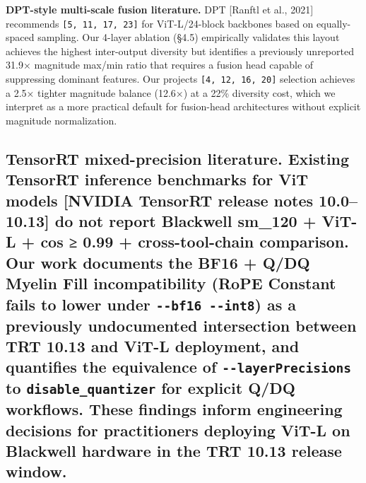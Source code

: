 \documentclass[
]{article}
\begin{document}
\textbf{DPT-style multi-scale fusion literature.} DPT {[}Ranftl et al.,
2021{]} recommends \texttt{{[}5,\ 11,\ 17,\ 23{]}} for ViT-L/24-block
backbones based on equally-spaced sampling. Our 4-layer ablation (§4.5)
empirically validates this layout achieves the highest inter-output
diversity but identifies a previously unreported 31.9× magnitude max/min
ratio that requires a fusion head capable of suppressing dominant
features. Our project\textquotesingle s \texttt{{[}4,\ 12,\ 16,\ 20{]}}
selection achieves a 2.5× tighter magnitude balance (12.6×) at a 22\%
diversity cost, which we interpret as a more practical default for
fusion-head architectures without explicit magnitude normalization.

\subsection{\texorpdfstring{\textbf{TensorRT mixed-precision
literature.} Existing TensorRT inference benchmarks for ViT models
{[}NVIDIA TensorRT release notes 10.0--10.13{]} do not report Blackwell
sm\_120 + ViT-L + cos ≥ 0.99 + cross-tool-chain comparison. Our work
documents the BF16 + Q/DQ Myelin Fill incompatibility (RoPE Constant
fails to lower under \texttt{-\/-bf16\ -\/-int8}) as a previously
undocumented intersection between TRT 10.13 and ViT-L deployment, and
quantifies the equivalence of \texttt{-\/-layerPrecisions} to
\texttt{disable\_quantizer} for explicit Q/DQ workflows. These findings
inform engineering decisions for practitioners deploying ViT-L on
Blackwell hardware in the TRT 10.13 release
window.}{TensorRT mixed-precision literature. Existing TensorRT inference benchmarks for ViT models {[}NVIDIA TensorRT release notes 10.0--10.13{]} do not report Blackwell sm\_120 + ViT-L + cos ≥ 0.99 + cross-tool-chain comparison. Our work documents the BF16 + Q/DQ Myelin Fill incompatibility (RoPE Constant fails to lower under -\/-bf16 -\/-int8) as a previously undocumented intersection between TRT 10.13 and ViT-L deployment, and quantifies the equivalence of -\/-layerPrecisions to disable\_quantizer for explicit Q/DQ workflows. These findings inform engineering decisions for practitioners deploying ViT-L on Blackwell hardware in the TRT 10.13 release window.}}\label{tensorrt-mixed-precision-literature-existing-tensorrt-inference-benchmarks-for-vit-models-nvidia-tensorrt-release-notes-1001013-do-not-report-blackwell-sm_120--vit-l--cos--099--cross-tool-chain-comparison-our-work-documents-the-bf16--qdq-myelin-fill-incompatibility-rope-constant-fails-to-lower-under---bf16---int8-as-a-previously-undocumented-intersection-between-trt-1013-and-vit-l-deployment-and-quantifies-the-equivalence-of---layerprecisions-to-disable_quantizer-for-explicit-qdq-workflows-these-findings-inform-engineering-decisions-for-practitioners-deploying-vit-l-on-blackwell-hardware-in-the-trt-1013-release-window}
\end{document}

